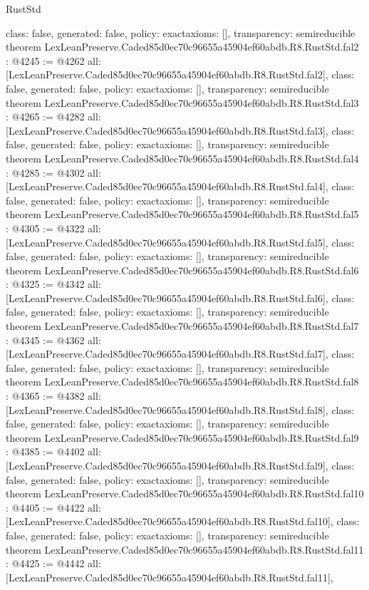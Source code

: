 \begin{lexlean}{RustStd}
\begin{coremodule}
{  class: false,
  generated: false,
  policy: exact{axioms: []},
  transparency: semireducible
}
theorem LexLeanPreserve.Caded85d0ec70c96655a45904ef60abdb.R8.RustStd.fal2 : @4245 := @4262 {
  all: [LexLeanPreserve.Caded85d0ec70c96655a45904ef60abdb.R8.RustStd.fal2],
  class: false,
  generated: false,
  policy: exact{axioms: []},
  transparency: semireducible
}
theorem LexLeanPreserve.Caded85d0ec70c96655a45904ef60abdb.R8.RustStd.fal3 : @4265 := @4282 {
  all: [LexLeanPreserve.Caded85d0ec70c96655a45904ef60abdb.R8.RustStd.fal3],
  class: false,
  generated: false,
  policy: exact{axioms: []},
  transparency: semireducible
}
theorem LexLeanPreserve.Caded85d0ec70c96655a45904ef60abdb.R8.RustStd.fal4 : @4285 := @4302 {
  all: [LexLeanPreserve.Caded85d0ec70c96655a45904ef60abdb.R8.RustStd.fal4],
  class: false,
  generated: false,
  policy: exact{axioms: []},
  transparency: semireducible
}
theorem LexLeanPreserve.Caded85d0ec70c96655a45904ef60abdb.R8.RustStd.fal5 : @4305 := @4322 {
  all: [LexLeanPreserve.Caded85d0ec70c96655a45904ef60abdb.R8.RustStd.fal5],
  class: false,
  generated: false,
  policy: exact{axioms: []},
  transparency: semireducible
}
theorem LexLeanPreserve.Caded85d0ec70c96655a45904ef60abdb.R8.RustStd.fal6 : @4325 := @4342 {
  all: [LexLeanPreserve.Caded85d0ec70c96655a45904ef60abdb.R8.RustStd.fal6],
  class: false,
  generated: false,
  policy: exact{axioms: []},
  transparency: semireducible
}
theorem LexLeanPreserve.Caded85d0ec70c96655a45904ef60abdb.R8.RustStd.fal7 : @4345 := @4362 {
  all: [LexLeanPreserve.Caded85d0ec70c96655a45904ef60abdb.R8.RustStd.fal7],
  class: false,
  generated: false,
  policy: exact{axioms: []},
  transparency: semireducible
}
theorem LexLeanPreserve.Caded85d0ec70c96655a45904ef60abdb.R8.RustStd.fal8 : @4365 := @4382 {
  all: [LexLeanPreserve.Caded85d0ec70c96655a45904ef60abdb.R8.RustStd.fal8],
  class: false,
  generated: false,
  policy: exact{axioms: []},
  transparency: semireducible
}
theorem LexLeanPreserve.Caded85d0ec70c96655a45904ef60abdb.R8.RustStd.fal9 : @4385 := @4402 {
  all: [LexLeanPreserve.Caded85d0ec70c96655a45904ef60abdb.R8.RustStd.fal9],
  class: false,
  generated: false,
  policy: exact{axioms: []},
  transparency: semireducible
}
theorem LexLeanPreserve.Caded85d0ec70c96655a45904ef60abdb.R8.RustStd.fal10 : @4405 := @4422 {
  all: [LexLeanPreserve.Caded85d0ec70c96655a45904ef60abdb.R8.RustStd.fal10],
  class: false,
  generated: false,
  policy: exact{axioms: []},
  transparency: semireducible
}
theorem LexLeanPreserve.Caded85d0ec70c96655a45904ef60abdb.R8.RustStd.fal11 : @4425 := @4442 {
  all: [LexLeanPreserve.Caded85d0ec70c96655a45904ef60abdb.R8.RustStd.fal11],
}
\end{coremodule}
\end{lexlean}
